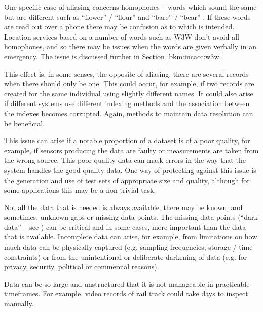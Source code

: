 \begin{description}
	One specific case of aliasing  concerns homophones -- words which sound the same but are different such as ``flower'' / ``flour'' and ``bare'' / ``bear'' \cite{citation:homonym}.
	If these words are read out over a phone there may be confusion as to which is intended.
	Location services based on a number of words such as W3W don't avoid all homophones,
	and so there may be issues when the words are given verbally in an emergency. The issue is discussed further in Section \autoref{bkm:incacc:w3w}.
	
	\item[Disassociation:] This effect is, in some senses, the opposite of aliasing: there are several records when there should only be one. This could occur, for example, if two records are created for the same individual using slightly different names. It could also arise if different systems use different indexing methods and the association between the indexes becomes corrupted. Again, methods to maintain data resolution can be beneficial.
	
	\item[Masking:] This issue can arise if a notable proportion of a \gls{dataset} is of a poor \gls{quality}, for example, if sensors producing the data are faulty or measurements are taken from the wrong source. This poor quality data can mask errors in the way that the system handles the good quality data. One way of protecting against this issue is the generation and use of test sets of appropriate size and quality, although for some applications this may be a non-trivial task.
	
	\item[Incompleteness:] Not all the data that is needed is always available; there may be known, and sometimes, unknown gaps or missing data points. The missing data points (``dark data'' -- see )
	can be critical and in some cases, more important than the data that is available. Incomplete data can arise, for example, from limitations on how much data can be physically captured (e.g. sampling frequencies, storage / time constraints) or from the unintentional or deliberate darkening of data (e.g. for privacy, security, political or commercial reasons).
	
	\item[Volume:] Data can be so large and unstructured that it is not manageable in practicable timeframes.
	For example, video records of rail track could take days to inspect manually.
	

\end{description}
